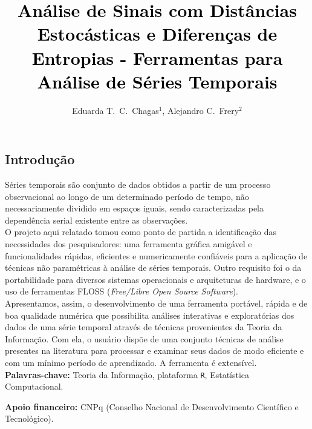 \documentclass[a0,portrait]{sciposter}
\title{\Huge \textcolor{black}{Análise de Sinais com Distâncias Estocásticas e Diferenças de Entropias - Ferramentas para Análise de Séries Temporais}}
\author{Eduarda T.\ C.\ Chagas$^{1}$, Alejandro C.\ Frery$^{2}$}
\institute{$^{1}$Estudante de IC de Ciência da Computação, Ufal\\
$^{2}$Pesquisador do LaCCAN, Ufal}
\begin{document}
\maketitle

\vspace{1cm}

\begin{multicols}{2} %


\color{Black}
\section*{Introdução}

\quad Séries temporais são conjunto de dados obtidos a partir de um processo observacional ao longo de um determinado período de tempo, não necessariamente dividido em espaços iguais, sendo caracterizadas pela dependência serial existente entre as observações.\\

O projeto aqui relatado tomou como ponto de partida a identificação das necessidades dos pesquisadores: uma ferramenta gráfica amigável e funcionalidades rápidas, eficientes e numericamente confiáveis para a aplicação de técnicas não paramétricas à análise de séries temporais.
Outro requisito foi o da portabilidade para diversos sistemas operacionais e arquiteturas de hardware, e o uso de ferramentas FLOSS (\textit{Free/Libre Open Source Software}).\\
 
Apresentamos, assim, o desenvolvimento de uma ferramenta portável, rápida e de boa qualidade numérica que possibilita análises interativas e exploratórias dos dados de uma série temporal através de técnicas provenientes da Teoria da Informação.
Com ela, o usuário dispõe de uma conjunto técnicas de análise presentes na literatura para processar e examinar seus dados de modo eficiente e com um mínimo período de aprendizado.
A ferramenta é extensível.\\

\textbf{Palavras-chave:} Teoria da Informação, plataforma \texttt R, Estatística Computacional.

\textbf{Apoio financeiro:} CNPq (Conselho Nacional de Desenvolvimento Científico e \\Tecnológico).


\end{multicols}
\end{document}

